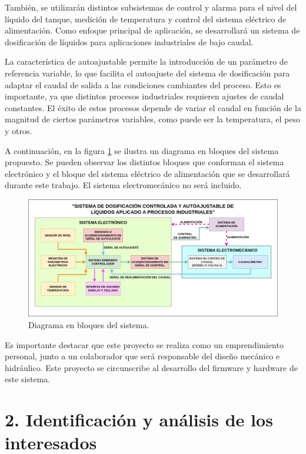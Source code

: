 \documentclass[
11pt, %
]{charter}
\begin{document}
También, se utilizarán distintos subsistemas de control y alarma para el nivel del líquido del tanque, medición de temperatura y control del sistema eléctrico de alimentación. Como enfoque principal de aplicación, se desarrollará un sistema de dosificación de líquidos para aplicaciones industriales de bajo caudal.

La característica de autoajustable permite la introducción de un parámetro de referencia variable, lo que facilita el autoajuste del sistema de dosificación para adaptar el caudal de salida a las condiciones cambiantes del proceso. Esto es importante, ya que distintos procesos industriales requieren ajustes de caudal constantes. El éxito de estos procesos depende de variar el caudal en función de la magnitud de ciertos parámetros variables, como puede ser la temperatura, el peso y otros.

A continuación, en la figura \ref{fig:diagBloquesGeneral} se ilustra un diagrama en bloques del sistema propuesto. Se pueden observar los distintos bloques que conforman el sistema electrónico y el bloque del sistema eléctrico de alimentación que se desarrollará durante este trabajo. El sistema electromecánico no será incluido.

\begin{figure}[htpb]
\centering 
\includegraphics[width=.95\textwidth]{./Figuras/diagBloquesGeneral.png}
\caption{Diagrama en bloques del sistema.}
\label{fig:diagBloquesGeneral}
\end{figure}

Es importante destacar que este proyecto se realiza como un emprendimiento personal, junto a un colaborador que será responsable del diseño mecánico e hidráulico. Este proyecto se circunscribe al desarrollo del firmware y hardware de este sistema.

\section{2. Identificación y análisis de los interesados}
\label{sec:interesados}
\end{document}
